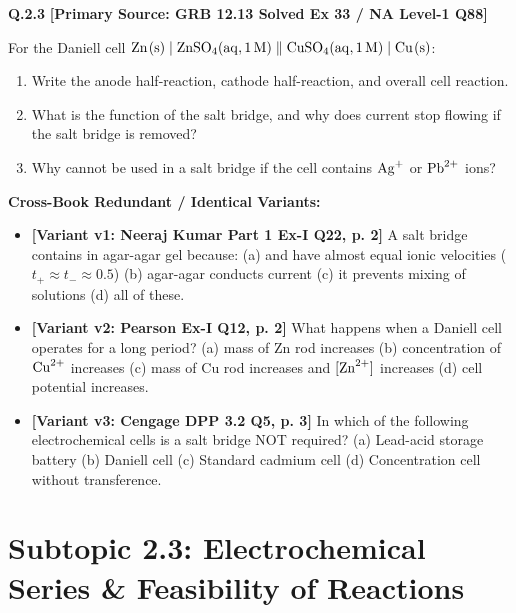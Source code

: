 \begin{problembox}
\textbf{Q.2.3} \hfill \textbf{[Primary Source: GRB  12.13 Solved Ex 33 / NA Level-1 Q88]}
\label{q:qb-c2-03}

For the Daniell cell $\ce{Zn(s)} \mid \ce{ZnSO4(aq, } 1\,\text{M}\ce{)} \parallel \ce{CuSO4(aq, } 1\,\text{M}\ce{)} \mid \ce{Cu(s)}$:
\begin{enumerate}[label=(\alph*)]
    \item Write the anode half-reaction, cathode half-reaction, and overall cell reaction.
    \item What is the function of the salt bridge, and why does current stop flowing if the salt bridge is removed?
    \item Why cannot  be used in a salt bridge if the cell contains $\ce{Ag+}$ or $\ce{Pb^2+}$ ions?
\end{enumerate}

\tcbline
\textbf{\color{accentamber}Cross-Book Redundant / Identical Variants:}
\begin{itemize}[leftmargin=*,itemsep=2pt]
    \item \textbf{[Variant v1: Neeraj Kumar Part 1 Ex-I Q22, p. 2]} A salt bridge contains  in agar-agar gel because: (a)  and  have almost equal ionic velocities ($t_+ \approx t_- \approx 0.5$) (b) agar-agar conducts current (c) it prevents mixing of solutions (d) all of these.
    \item \textbf{[Variant v2: Pearson Ex-I Q12, p. 2]} What happens when a Daniell cell operates for a long period? (a) mass of Zn rod increases (b) concentration of $\ce{Cu^2+}$ increases (c) mass of Cu rod increases and $[\ce{Zn^2+}]$ increases (d) cell potential increases.
    \item \textbf{[Variant v3: Cengage DPP 3.2 Q5, p. 3]} In which of the following electrochemical cells is a salt bridge NOT required? (a) Lead-acid storage battery (b) Daniell cell (c) Standard cadmium cell (d) Concentration cell without transference.
\end{itemize}
\end{problembox}

\section{Subtopic 2.3: Electrochemical Series \& Feasibility of Reactions}

